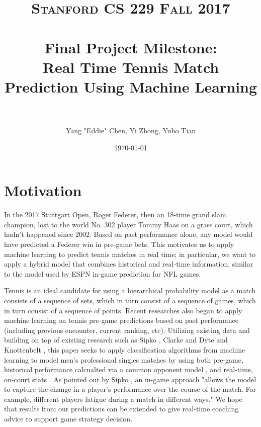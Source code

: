 \documentclass[paper=a4, fontsize=11pt]{scrartcl} %
\title{	
\normalfont \normalsize 
\textsc{Stanford CS 229 Fall 2017} \\ [25pt] %
\horrule{0.5pt} \\[0.4cm] %
\Large Final Project Milestone: \\
\Large Real Time Tennis Match Prediction Using Machine Learning\\ %
\horrule{2pt} \\[0.5cm] %
}
\author{Yang "Eddie" Chen, Yi Zhong, Yubo Tian} %
\date{\normalsize\today} %
\numberwithin{equation}{section} %
\numberwithin{figure}{section} %
\numberwithin{table}{section} %
\begin{document}
\maketitle %


\section{Motivation}
In the 2017 Stuttgart Open, Roger Federer, then an 18-time grand slam champion, lost to the world No. 302 player Tommy Haas on a grass court, which hadn't happened since 2002.  Based on past performance alone, any model would have predicted a Federer win in pre-game bets. This motivates us to apply machine learning to predict tennis matches in real time; in particular, we want to apply a hybrid model that combines historical and real-time information, similar to the model used by ESPN in-game prediction for NFL games.

Tennis is an ideal candidate for using a hierarchical probability model as a match consists of a sequence of sets, which in turn consist of a sequence of games, which in turn consist of a sequence of points.  Recent researches also began to apply machine learning on tennis pre-game predictions based on past performance (including previous encounter, current ranking, etc). Utilizing existing data and building on top of existing research such as Sipko \cite{tennis1}, Clarke and Dyte \cite{Clarke2010} and Knottenbelt \cite{KNOTTENBELT20123820}, this paper seeks to apply classification algorithms from machine learning to model men's professional singles matches by using both pre-game, historical performance calcualted via a common opponent model \cite{KNOTTENBELT20123820}, and real-time, on-court stats \cite{tennis_charting} \cite{tennis2setbyset}. As pointed out by Sipko \cite{tennis1}, an in-game approach "allows the model to capture the change in a player's performance over the course of the match. For example, different players fatigue during a match in different ways." We hope that results from our predictions can be extended to give real-time coaching advice to support game strategy decision.
\end{document}
